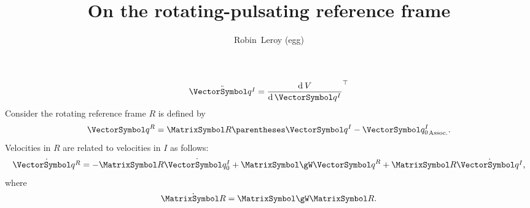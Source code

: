 \documentclass[10pt, a4paper, twoside]{basestyle}
\title{On the rotating-pulsating reference frame}
\date{\printdate{2023-01-32}}
\author{Robin~Leroy (egg)}
\begin{document}
\maketitle


\begin{equation}
\SecondTimeDerivative{\vq^I}=\Transpose{\deriv{\vq^I}{V}}
\end{equation}
Consider the rotating reference frame $R$ is defined by
\begin{equation}
\vq^R = \matR \pa{\vq^I - \vq_0^I}\text.
\end{equation}
Velocities in $R$ are related to velocities in $I$ as follows:
\[\TimeDerivative{\vq^R} =  -  \matR \TimeDerivative{\vq_0^I} + \MatrixSymbol\gW \vq^R + \matR \TimeDerivative{\vq^I}\text,\]
where
\[
\TimeDerivative{\matR}=\MatrixSymbol\gW \matR\text.
\]
\end{document}
